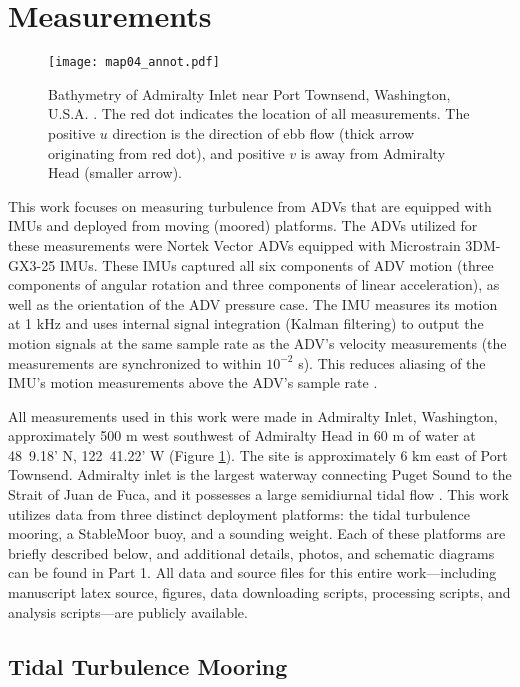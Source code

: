 
\section{Measurements}
\label{sec:meas}

\begin{figure}[t]
  \centering
  \texttt{[image: map04\_annot.pdf]}
  \caption{Bathymetry of Admiralty Inlet near Port Townsend, Washington, U.S.A. \cite[]{Finlayson2005}. The red dot indicates the location of all measurements. The positive $u$ direction is the direction of ebb flow (thick arrow originating from red dot), and positive $v$ is away from Admiralty Head (smaller arrow).}
  \label{fig:map}
\end{figure}

This work focuses on measuring turbulence from ADVs that are equipped with IMUs and deployed from moving (moored) platforms.
The ADVs utilized for these measurements were Nortek Vector ADVs equipped with Microstrain 3DM-GX3-25 IMUs. These IMUs captured all six components of ADV motion (three components of angular rotation and three components of linear acceleration), as well as the orientation of the ADV pressure case. The IMU measures its motion at 1 kHz and uses internal signal integration (Kalman filtering) to output the motion signals at the same sample rate as the ADV's velocity measurements (the measurements are synchronized to within $10^{-2}$ s). This reduces aliasing of the IMU's motion measurements above the ADV's sample rate \cite[]{3DM-GX3_coning_sculling}.

All measurements used in this work were made in Admiralty Inlet, Washington, approximately 500 m west southwest of Admiralty Head in 60 m of water at 48\deg\ 9.18' N, 122\deg\ 41.22' W (Figure \ref{fig:map}). The site is approximately 6 km east of Port Townsend.  Admiralty inlet is the largest waterway connecting Puget Sound to the Strait of Juan de Fuca, and it possesses a large semidiurnal tidal flow \cite[]{Thomson++2012, Polagye+Thomson2013}.  This work utilizes data from three distinct deployment platforms: the tidal turbulence mooring, a StableMoor buoy, and a sounding weight.   Each of these platforms are briefly described below, and additional details, photos, and schematic diagrams can be found in Part 1. All data and source files for this entire work---including manuscript latex source, figures, data downloading scripts, processing scripts, and analysis scripts---are publicly available.

\subsection{Tidal Turbulence Mooring}

